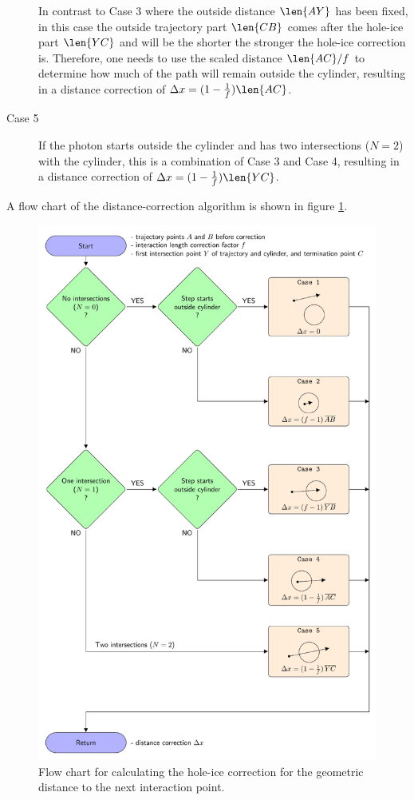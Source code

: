 \begin{description}
  In contrast to Case 3 where the outside distance $\len{AY}$ has been fixed, in this case the outside trajectory part $\len{CB}$ comes after the hole-ice part $\len{YC}$ and will be the shorter the stronger the hole-ice correction is. Therefore, one needs to use the scaled distance $\len{AC} / f$ to determine how much of the path will remain outside the cylinder, resulting in a distance correction of $\Delta x = (1 - \frac{1}{f})\len{AC}$.
  \item[Case 5] If the photon starts outside the cylinder and has two intersections ($N = 2$) with the cylinder, this is a combination of Case 3 and Case 4, resulting in a distance correction of $\Delta x = (1 - \frac{1}{f})\len{YC}$.
\end{description}

A flow chart of the distance-correction algorithm is shown in figure \ref{fig:Eeshi4Oh}.

\begin{figure}[htbp]
  \includegraphics[height=\textheight]{img/algorithm-hole-ice-correction-2017-case-ordered}
  \caption{Flow chart for calculating the hole-ice correction for the geometric distance to the next interaction point.}
  \label{fig:Eeshi4Oh}
\end{figure}

